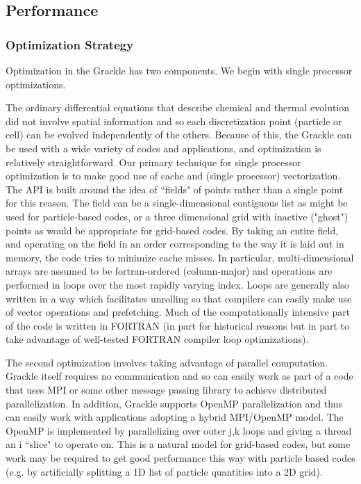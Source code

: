 \subsection{Performance}


\subsubsection{Optimization Strategy}

Optimization in the Grackle has two components.  We begin with single processor optimizations.  

The ordinary differential equations that describe chemical and thermal evolution did not involve spatial information and so each discretization point (particle or cell) can be evolved independently of the others.  Because of this, the Grackle can be used with a wide variety of codes and applications, and optimization is relatively straightforward.  Our primary technique for single processor optimization is to make good use of cache and (single processor) vectorization.  The API is built around the idea of ``fields" of points rather than a single point for this reason.  The field can be a single-dimensional contiguous list as might be used for particle-based codes, or a three dimensional grid with inactive ("ghost") points as would be appropriate for grid-based codes.  By taking an entire field, and operating on the field in an order corresponding to the way it is laid out in memory, the code tries to minimize cache misses.  In particular, multi-dimensional arrays are assumed to be fortran-ordered (column-major) and operations are performed in loops over the most rapidly varying index.  Loops are generally also written in a way which facilitates unrolling so that compilers can easily make use of vector operations and prefetching.  Much of the computationally intensive part of the code is written in FORTRAN (in part for historical reasons but in part to take advantage of well-tested FORTRAN compiler loop optimizations).

The second optimization involves taking advantage of parallel computation.  Grackle itself requires no communication and so can easily work as part of a code that uses MPI or some other message passing library to achieve distributed parallelization.  In addition, Grackle supports OpenMP parallelization and thus can easily work with applications adopting a hybrid MPI/OpenMP model.  The OpenMP is implemented by parallelizing over outer j,k loops and giving a thread an i ``slice" to operate on.  This is a natural model for grid-based codes, but some work may be required to get good performance this way with particle based codes (e.g. by artificially splitting a 1D list of particle quantities into a 2D grid).

